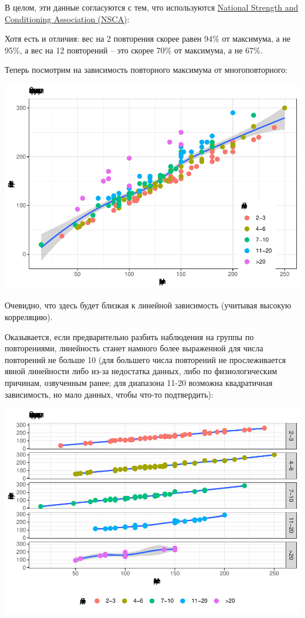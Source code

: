 \documentclass[
]{article}
\begin{document}
В целом, эти данные согласуются с тем, что используются
\href{https://www.nsca.com}{National Strength and Conditioning
Association (NSCA)}:

Хотя есть и отличия: вес на 2 повторения скорее равен 94\% от максимума,
а не 95\%, а вес на 12 повторений -- это скорее 70\% от максимума, а не
67\%.

Теперь посмотрим на зависимость повторного максимума от многоповторного:

\begin{center}\includegraphics[width=0.85\linewidth]{Regression-model-for-estimating-RM_files/figure-latex/unnamed-chunk-20-1} \end{center}

Очевидно, что здесь будет близкая к линейной зависимость (учитывая
высокую корреляцию).

Оказывается, если предварительно разбить наблюдения на группы по
повторениями, линейность станет намного более выраженной для числа
повторений не больше 10 (для большего числа повторений не прослеживается
явной линейности либо из-за недостатка данных, либо по физиологическим
причинам, озвученным ранее; для диапазона 11-20 возможна квадратичная
зависимость, но мало данных, чтобы что-то подтвердить):

\begin{center}\includegraphics[width=0.9\linewidth]{Regression-model-for-estimating-RM_files/figure-latex/unnamed-chunk-21-1} \end{center}
\end{document}
